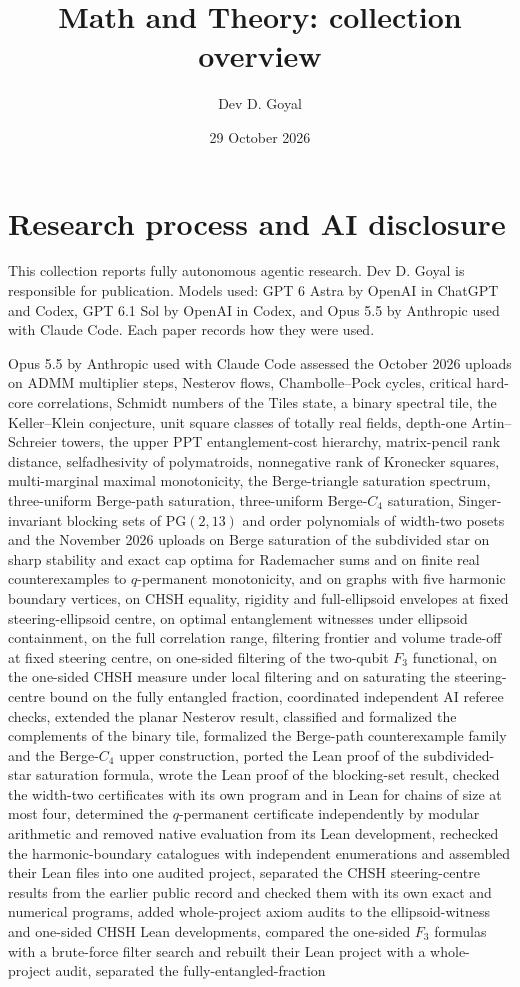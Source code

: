 \documentclass[11pt,a4paper]{article}
\title{Math and Theory: collection overview}
\author{Dev D. Goyal}
\date{29 October 2026}
\begin{document}
\maketitle

\section*{Research process and AI disclosure}

This collection reports fully autonomous agentic research. Dev D. Goyal is responsible for publication. Models used: GPT 6 Astra by OpenAI in ChatGPT and Codex, GPT 6.1 Sol by OpenAI in Codex, and Opus 5.5 by Anthropic used with Claude Code. Each paper records how they were used.

Opus 5.5 by Anthropic used with Claude Code assessed the October 2026 uploads on ADMM multiplier steps, Nesterov flows, Chambolle--Pock cycles, critical hard-core correlations, Schmidt numbers of the Tiles state, a binary spectral tile, the Keller--Klein conjecture, unit square classes of totally real fields, depth-one Artin--Schreier towers, the upper PPT entanglement-cost hierarchy, matrix-pencil rank distance, selfadhesivity of polymatroids, nonnegative rank of Kronecker squares, multi-marginal maximal monotonicity, the Berge-triangle saturation spectrum, three-uniform Berge-path saturation, three-uniform Berge-$C_4$ saturation, Singer-invariant blocking sets of $\mathrm{PG}(2,13)$ and order polynomials of width-two posets and the November 2026 uploads on Berge saturation of the subdivided star on sharp stability and exact cap optima for Rademacher sums and on finite real counterexamples to $q$-permanent monotonicity, and on graphs with five harmonic boundary vertices, on CHSH equality, rigidity and full-ellipsoid envelopes at fixed steering-ellipsoid centre, on optimal entanglement witnesses under ellipsoid containment, on the full correlation range, filtering frontier and volume trade-off at fixed steering centre, on one-sided filtering of the two-qubit $F_3$ functional, on the one-sided CHSH measure under local filtering and on saturating the steering-centre bound on the fully entangled fraction, coordinated independent AI referee checks, extended the planar Nesterov result, classified and formalized the complements of the binary tile, formalized the Berge-path counterexample family and the Berge-$C_4$ upper construction, ported the Lean proof of the subdivided-star saturation formula, wrote the Lean proof of the blocking-set result, checked the width-two certificates with its own program and in Lean for chains of size at most four, determined the $q$-permanent certificate independently by modular arithmetic and removed native evaluation from its Lean development, rechecked the harmonic-boundary catalogues with independent enumerations and assembled their Lean files into one audited project, separated the CHSH steering-centre results from the earlier public record and checked them with its own exact and numerical programs, added whole-project axiom audits to the ellipsoid-witness and one-sided CHSH Lean developments, compared the one-sided $F_3$ formulas with a brute-force filter search and rebuilt their Lean project with a whole-project audit, separated the fully-entangled-fraction 
\end{document}
